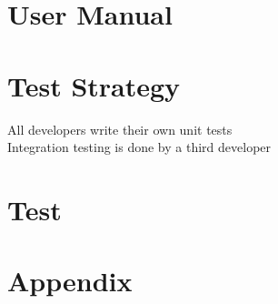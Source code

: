 \documentclass{report}
\begin{document}
\chapter{User Manual}

\chapter{Test Strategy}
All developers write their own unit tests \\
Integration testing is done by a third developer

\chapter{Test}

\chapter{Appendix}
\end{document}
